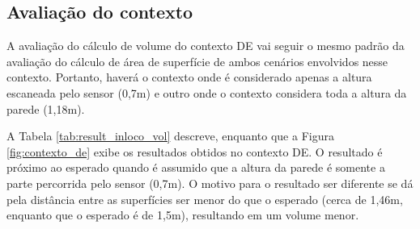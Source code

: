 \subsection{Avaliação do contexto}
\label{sec:avaliacao_contexto_inloco}

A avaliação do cálculo de volume do contexto DE vai seguir o mesmo padrão da avaliação do cálculo de área de superfície de ambos cenários envolvidos nesse contexto.
Portanto, haverá o contexto onde é considerado apenas a altura escaneada pelo sensor (0,7m) e outro onde o contexto considera toda a altura da parede (1,18m).

A Tabela \ref{tab:result_inloco_vol} descreve,  enquanto que a Figura \ref{fig:contexto_de} exibe os resultados obtidos no contexto DE.
O resultado é próximo ao esperado quando é assumido que a altura da parede é somente a parte percorrida pelo sensor (0,7m).
O motivo para o resultado ser diferente se dá pela distância entre as superfícies ser menor do que o esperado (cerca de 1,46m, enquanto que o esperado é de 1,5m), resultando em um volume menor.

